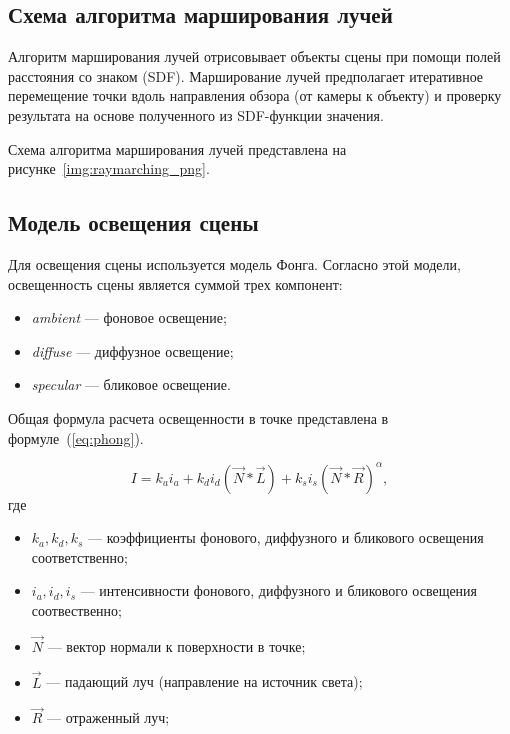 \clearpage

\subsection{Схема алгоритма марширования лучей}

Алгоритм марширования лучей отрисовывает объекты сцены при помощи полей расстояния со знаком (SDF).
Марширование лучей предполагает итеративное перемещение точки вдоль направления обзора (от камеры к объекту)
и проверку результата на основе полученного из SDF-функции значения.

Схема алгоритма марширования лучей представлена на рисунке~\ref{img:raymarching_png}.


\clearpage

\subsection{Модель освещения сцены}

Для освещения сцены используется модель Фонга. Согласно этой модели,
освещенность сцены является суммой трех компонент:

\begin{itemize}
  \item \textit{ambient} --- фоновое освещение;
  \item \textit{diffuse} --- диффузное освещение;
  \item \textit{specular} --- бликовое освещение.
\end{itemize}

Общая формула расчета освещенности в точке представлена в формуле~(\ref{eq:phong}).

\begin{equation}
  I = k_a i_a + k_d i_d (\vec{N} * \vec{L}) + k_s i_s (\vec{N} * \vec{R}) ^ \alpha,
  \label{eq:phong}
\end{equation}
где
\begin{itemize}
  \item $k_a, k_d, k_s$ --- коэффициенты фонового, диффузного и бликового освещения соответственно;
  \item $i_a, i_d, i_s$ --- интенсивности фонового, диффузного и бликового освещения соотвественно;
  \item $\vec{N}$ --- вектор нормали к поверхности в точке;
  \item $\vec{L}$ --- падающий луч (направление на источник света);
  \item $\vec{R}$ --- отраженный луч;
\end{itemize}

